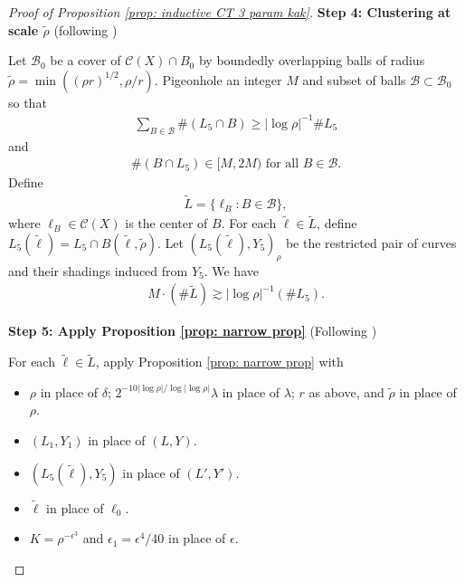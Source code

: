 \documentclass[12pt]{amsart}
\numberwithin{equation}{section}
\newcommand{\1}{\mathbbm{1}}
\begin{document}
\begin{proof}[Proof of Proposition \ref{prop: inductive CT 3 param kak}]
    \medskip 

    \noindent \textbf{Step 4: Clustering at scale $\tilde \rho$} (following \cite[Step 4 pg. 17]{KWZ})
    

    Let $\mathcal B_0$ be a cover of $\mathcal C(X) \cap B_0$ by boundedly overlapping balls of radius $\tilde \rho = \min((\rho r)^{1/2}, \rho / r)$. Pigeonhole an integer $M$ and subset of balls $\mathcal B \subset \mathcal B_0$ so that 
    \begin{align}
        \sum_{B \in \mathcal B} \# (L_5 \cap B) \geq |\log \rho|^{-1} \# L_5
    \end{align}
    and 
    \begin{align}
        \#(B \cap L_5) \in [M, 2M) \text{ for all $B \in \mathcal B$.}
    \end{align}
    Define 
    \begin{align}
        \tilde L = \{\ell_B : B \in \mathcal B\},
    \end{align}
    where $\ell_B \in \mathcal C(X)$ is the center of $B$. For each $\tilde \ell \in \tilde L$, define $L_5(\tilde \ell) = L_5 \cap B(\tilde \ell, \tilde \rho)$. Let $(L_5(\tilde \ell), Y_5)_{\rho}$ be the restricted pair of curves and their shadings induced from $Y_5$. We have 
    \begin{align}
        M \cdot (\# \tilde L) \gtrsim |\log \rho|^{-1} (\# L_5).
    \end{align}

    \medskip
    
    \noindent \textbf{Step 5: Apply Proposition \ref{prop: narrow prop}} (Following \cite[Step 5 pg. 18]{KWZ})

    For each $\tilde \ell \in \tilde L$, apply Proposition \ref{prop: narrow prop} with 
    \begin{itemize}
        \item $\rho$ in place of $\delta$; $2^{-10 |\log \rho|/\log |\log \rho|} \lambda$ in place of $\lambda$; $r$ as above, and $\tilde \rho$ in place of $\rho$. 
        \item $(L_1,Y_1)$ in place of $(L,Y)$.
        \item $(L_5(\tilde \ell), Y_5)$ in place of $(L', Y')$.
        \item $\tilde \ell$ in place of $\ell_0$.
        \item $K = \rho^{-\epsilon^3}$ and $\epsilon_1 = \epsilon^4 / 40$ in place of $\epsilon$. 
    \end{itemize}


\end{proof}
\end{document}
